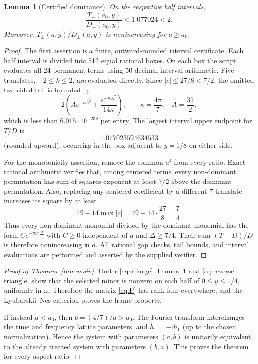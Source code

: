 \documentclass[11pt]{article}
\newtheorem{lemma}{Lemma}
\begin{document}
\begin{lemma}[Certified dominance]\label{lem:certificate}
On the respective half intervals,
\[
 \frac{T_\pm(a_0,y)}{D_\pm(a_0,y)}<1.077024<2.
\]
Moreover, $T_\pm(a,y)/D_\pm(a,y)$ is nonincreasing for $a\ge a_0$.
\end{lemma}

\begin{proof}
The first assertion is a finite, outward-rounded interval certificate.  Each
half interval is divided into 512 equal rational boxes.  On each box the
script evaluates all $24$ permanent terms using 50-decimal interval
arithmetic.  Five translates, $-2\le k\le2$, are evaluated directly.  Since
$|c|\le27/8<7/2$, the omitted two-sided tail is bounded by
\begin{equation}\label{eq:tail}
 2\left(Ae^{-\kappa A^2}
 +\frac{e^{-\kappa A^2}}{14\kappa}\right),\qquad
 \kappa=\frac{4\pi}{7},\quad A=\frac{35}{2},
\end{equation}
which is less than $6.015\cdot10^{-238}$ per entry.  The largest
interval upper endpoint for $T/D$ is
\[
 1.077023594634533
\]
(rounded upward), occurring in the box adjacent to $y=1/8$ on either side.

For the monotonicity assertion, remove the common $a^4$ from every ratio.
Exact rational arithmetic verifies that, among centered terms, every
non-dominant permutation has sum-of-squares exponent at least $7/2$ above
the dominant permutation.  Also, replacing any centered coefficient by a
different $7$-translate increases its square by at least
\[
 49-14\max|c|=49-14\cdot\frac{27}{8}=\frac74.
\]
Thus every non-dominant monomial divided by the dominant monomial has the
form $C e^{-\pi a^2\Delta}$ with $C\ge0$ independent of $a$ and
$\Delta\ge7/4$.  Their sum $(T-D)/D$ is therefore nonincreasing in $a$.
All rational gap checks, tail bounds, and interval evaluations are performed
and asserted by the supplied verifier.
\end{proof}

\begin{proof}[Proof of Theorem~\ref{thm:main}]
Under \eqref{eq:a-large}, Lemma~\ref{lem:certificate} and
\eqref{eq:reverse-triangle} show that the selected minor is nonzero on each
half of $0\le y\le1/4$, uniformly in $\omega$.  Therefore the matrix
\eqref{eq:P} has rank four everywhere, and the Lyubarskii--Nes criterion
proves the frame property.

If instead $a<a_0$, then $b=(4/7)/a>a_0$.  The Fourier transform interchanges
the time and frequency lattice parameters, and $\widehat h_1=-ih_1$ (up to
the chosen normalization).  Hence the system with parameters $(a,b)$ is
unitarily equivalent to the already treated system with parameters $(b,a)$.
This proves the theorem for every aspect ratio.
\end{proof}
\end{document}

